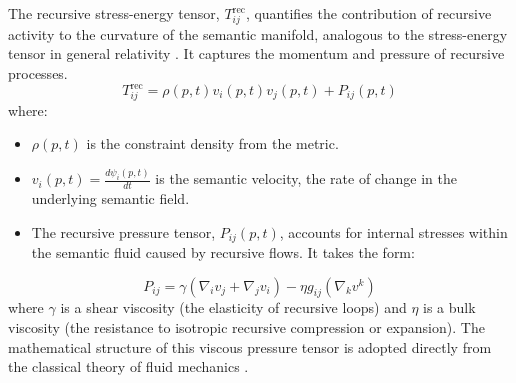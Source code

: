 The recursive stress-energy tensor, \(T_{ij}^{\text{rec}}\), quantifies the contribution of recursive activity to the curvature of the semantic manifold, analogous to the stress-energy tensor in general relativity \autocite{Einstein1915}. It captures the momentum and pressure of recursive processes.
\begin{equation}
T_{ij}^{\text{rec}} = \rho(p,t) v_i(p,t) v_j(p,t) + P_{ij}(p,t)
\end{equation}
where:
\begin{itemize}
    \item \(\rho(p,t)\) is the constraint density from the metric.
    \item \(v_i(p,t) = \frac{d\psi_i(p,t)}{dt}\) is the semantic velocity, the rate of change in the underlying semantic field.
    \item The recursive pressure tensor, \(P_{ij}(p,t)\), accounts for internal stresses within the semantic fluid caused by recursive flows. It takes the form:
\end{itemize}
\begin{equation}
P_{ij} = \gamma(\nabla_i v_j + \nabla_j v_i) - \eta g_{ij} (\nabla_k v^k)
\end{equation}
where \(\gamma\) is a shear viscosity (the elasticity of recursive loops) and \(\eta\) is a bulk viscosity (the resistance to isotropic recursive compression or expansion). The mathematical structure of this viscous pressure tensor is adopted directly from the classical theory of fluid mechanics \autocite{LandauLifshitz1987}.